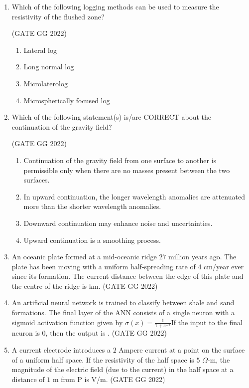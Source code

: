 \documentclass[journal]{IEEEtran}
\begin{document}
\begin{enumerate}
\item Which of the following logging methods can be used to measure the resistivity of the flushed zone?  

\hfill(GATE GG 2022)
\begin{enumerate}
\item Lateral log  
\item Long normal log  
\item Microlaterolog  
\item Microspherically focused log  
\end{enumerate}

\item Which of the following statement(s) is/are CORRECT about the continuation of the gravity field?  

\hfill(GATE GG 2022)
\begin{enumerate}
\item Continuation of the gravity field from one surface to another is permissible only when there are no masses present between the two surfaces.  
\item In upward continuation, the longer wavelength anomalies are attenuated more than the shorter wavelength anomalies.  
\item Downward continuation may enhance noise and uncertainties.  
\item Upward continuation is a smoothing process.  
\end{enumerate}

\item An oceanic plate formed at a mid-oceanic ridge $27$ million years ago. The plate has been moving with a uniform half-spreading rate of $4$ cm/year ever since its formation. The current distance between the edge of this plate and the centre of the ridge is \makebox[2cm]{\hrulefill} km.
\hfill(GATE GG 2022)
\vspace{0.5cm}

\item
An artificial neural network  is trained to classify between shale and sand formations. The final layer of the ANN consists of a single neuron with a sigmoid activation function given by  $\sigma(x) = \frac{1}{1+e^{-x}}$If the input to the final neuron is 0, then the output is \makebox[2cm]{\hrulefill}.   
\hfill(GATE GG 2022)
\vspace{0.5cm}

\item A current electrode introduces a $2$ Ampere current at a point  on  the surface of a uniform half space. If the resistivity of the half space is $5$ $\Omega$-m, the magnitude of the electric field (due to the current) in the half space at a distance of $1$ m from P is \makebox[2cm]{\hrulefill} V/m. 
\hfill(GATE GG 2022)
\vspace{0.5cm}
  

\end{enumerate}
\end{document}
